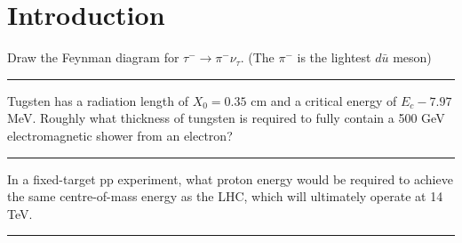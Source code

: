 \section{Introduction}
\begin{problem}{1.2}
Draw the Feynman diagram for $\tau^-\to\pi^-\nu_\tau$. (The $\pi^-$ is the lightest $d\bar{u}$ meson)
\end{problem}
\begin{solution}

\end{solution} 
\noindent\rule{7in}{1.5pt}


\begin{problem}{1.8}
Tugsten has a radiation length of $X_0=0.35$ cm and a critical energy of $E_c-7.97$ MeV. Roughly what thickness of tungsten is required to fully contain a 500 GeV electromagnetic shower from an electron?
\end{problem}

\begin{solution}

\end{solution} 
\noindent\rule{7in}{1.5pt}


\begin{problem}{1.10}
In a fixed-target pp experiment, what proton energy would be required to achieve the same centre-of-mass energy as the LHC, which will ultimately operate at 14 TeV.
\end{problem}
\begin{solution}
    
\end{solution} 
\noindent\rule{7in}{1.5pt}
    